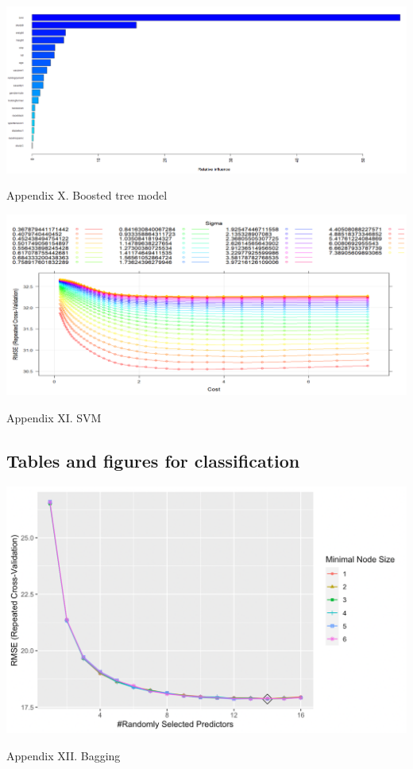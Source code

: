 \documentclass[
]{article}
\begin{document}
\begin{center}\includegraphics[width=0.9\linewidth,height=0.7\textheight]{primary_analysis_plot/boosting_plot} \end{center}
\begin{center}
Appendix X. Boosted tree model
\end{center}

\begin{center}\includegraphics[width=0.9\linewidth,height=0.7\textheight]{primary_analysis_plot/smv_plot} \end{center}
\begin{center}
Appendix XI. SVM
\end{center}

\hypertarget{tables-and-figures-for-classification}{%
\subsection{Tables and figures for
classification}\label{tables-and-figures-for-classification}}

\begin{center}\includegraphics[width=0.9\linewidth,height=0.7\textheight]{secondary_analysis_plot/rf} \end{center}
\begin{center}
Appendix XII. Bagging
\end{center}
\end{document}

